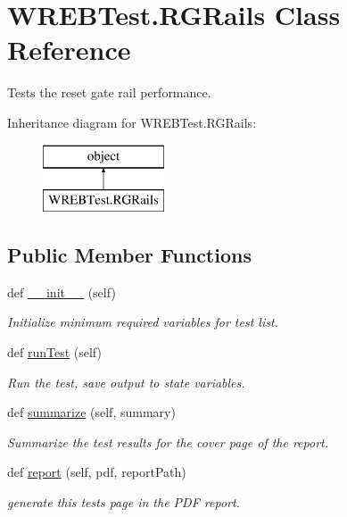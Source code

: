 \hypertarget{class_w_r_e_b_test_1_1_r_g_rails}{}\section{W\+R\+E\+B\+Test.\+R\+G\+Rails Class Reference}
\label{class_w_r_e_b_test_1_1_r_g_rails}


Tests the reset gate rail performance.  


Inheritance diagram for W\+R\+E\+B\+Test.\+R\+G\+Rails\+:\begin{figure}[H]
\begin{center}
\leavevmode
\includegraphics[height=2.000000cm]{class_w_r_e_b_test_1_1_r_g_rails}
\end{center}
\end{figure}
\subsection*{Public Member Functions}
\begin{DoxyCompactItemize}
\item 
def \hyperlink{class_w_r_e_b_test_1_1_r_g_rails_aa88fe8bf073459ccdd221172f50bf78c}{\+\_\+\+\_\+init\+\_\+\+\_\+} (self)
\begin{DoxyCompactList}\small\item\em Initialize minimum required variables for test list. \end{DoxyCompactList}\item 
def \hyperlink{class_w_r_e_b_test_1_1_r_g_rails_ad734ff3e10aac9d80365f55dc88f5adc}{run\+Test} (self)
\begin{DoxyCompactList}\small\item\em Run the test, save output to state variables. \end{DoxyCompactList}\item 
def \hyperlink{class_w_r_e_b_test_1_1_r_g_rails_a7c0b9c673b50fdaa24e1911a0634adca}{summarize} (self, summary)
\begin{DoxyCompactList}\small\item\em Summarize the test results for the cover page of the report. \end{DoxyCompactList}\item 
def \hyperlink{class_w_r_e_b_test_1_1_r_g_rails_a7736f682d02c1200e55ec3e587556c54}{report} (self, pdf, report\+Path)
\begin{DoxyCompactList}\small\item\em generate this test\textquotesingle{}s page in the P\+DF report. \end{DoxyCompactList}\end{DoxyCompactItemize}


